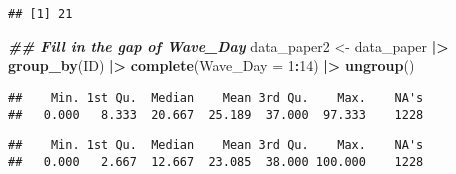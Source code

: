 \documentclass[
  12pt,
]{article}
\newenvironment{Shaded}{\begin{snugshade}}{\end{snugshade}}
\newcommand{\AttributeTok}[1]{\textcolor[rgb]{0.13,0.29,0.53}{#1}}
\newcommand{\CommentTok}[1]{\textcolor[rgb]{0.56,0.35,0.01}{\textit{#1}}}
\newcommand{\DecValTok}[1]{\textcolor[rgb]{0.00,0.00,0.81}{#1}}
\newcommand{\DocumentationTok}[1]{\textcolor[rgb]{0.56,0.35,0.01}{\textbf{\textit{#1}}}}
\newcommand{\FunctionTok}[1]{\textcolor[rgb]{0.13,0.29,0.53}{\textbf{#1}}}
\newcommand{\NormalTok}[1]{#1}
\newcommand{\OtherTok}[1]{\textcolor[rgb]{0.56,0.35,0.01}{#1}}
\newcommand{\SpecialCharTok}[1]{\textcolor[rgb]{0.81,0.36,0.00}{\textbf{#1}}}
\begin{document}
\begin{verbatim}
## [1] 21
\end{verbatim}

\begin{Shaded}
\begin{Highlighting}[]
\DocumentationTok{\#\# Fill in the gap of Wave\_Day}
\NormalTok{data\_paper2 }\OtherTok{\textless{}{-}}\NormalTok{ data\_paper }\SpecialCharTok{|\textgreater{}}
  \FunctionTok{group\_by}\NormalTok{(ID) }\SpecialCharTok{|\textgreater{}}
  \FunctionTok{complete}\NormalTok{(}\AttributeTok{Wave\_Day =} \DecValTok{1}\SpecialCharTok{:}\DecValTok{14}\NormalTok{) }\SpecialCharTok{|\textgreater{}}
  \FunctionTok{ungroup}\NormalTok{()}
\end{Highlighting}
\end{Shaded}

\begin{Shaded}
\end{Shaded}

\begin{verbatim}
##    Min. 1st Qu.  Median    Mean 3rd Qu.    Max.    NA's 
##   0.000   8.333  20.667  25.189  37.000  97.333    1228
\end{verbatim}

\begin{Shaded}
\end{Shaded}

\begin{verbatim}
##    Min. 1st Qu.  Median    Mean 3rd Qu.    Max.    NA's 
##   0.000   2.667  12.667  23.085  38.000 100.000    1228
\end{verbatim}

\begin{Shaded}
\end{Shaded}
\end{document}
